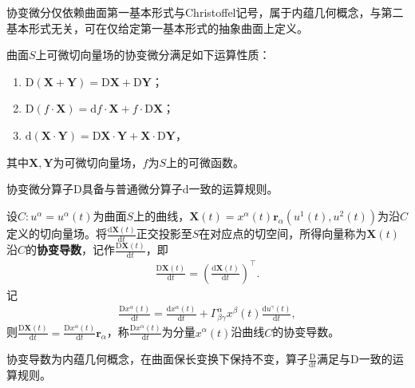 \documentclass[../../main.tex]{subfiles}%
\begin{document}
\begin{remark}
协变微分仅依赖曲面第一基本形式与Christoffel记号，属于内蕴几何概念，与第二基本形式无关，可在仅给定第一基本形式的抽象曲面上定义。
\end{remark}

\begin{theorem}
曲面$S$上可微切向量场的协变微分满足如下运算性质：
\begin{enumerate}[(1)]
\item $\mathrm{D}(\boldsymbol{X}+\boldsymbol{Y})=\mathrm{D}\boldsymbol{X}+\mathrm{D}\boldsymbol{Y}$；
\item $\mathrm{D}(f\cdot\boldsymbol{X})=\mathrm{d}f\cdot\boldsymbol{X}+f\cdot\mathrm{D}\boldsymbol{X}$；
\item $\mathrm{d}(\boldsymbol{X}\cdot\boldsymbol{Y})=\mathrm{D}\boldsymbol{X}\cdot\boldsymbol{Y}+\boldsymbol{X}\cdot\mathrm{D}\boldsymbol{Y}$，
\end{enumerate}
其中$\boldsymbol{X},\boldsymbol{Y}$为可微切向量场，$f$为$S$上的可微函数。
\end{theorem}

\begin{remark}
协变微分算子$\mathrm{D}$具备与普通微分算子$\mathrm{d}$一致的运算规则。
\end{remark}

\begin{definition}
设$C:u^\alpha=u^\alpha(t)$为曲面$S$上的曲线，$\boldsymbol{X}(t)=x^\alpha(t)\boldsymbol{r}_\alpha(u^1(t),u^2(t))$为沿$C$定义的切向量场。将$\frac{\mathrm{d}\boldsymbol{X}(t)}{\mathrm{d}t}$正交投影至$S$在对应点的切空间，所得向量称为$\boldsymbol{X}(t)$沿$C$的\textbf{协变导数}，记作$\frac{\mathrm{D}\boldsymbol{X}(t)}{\mathrm{d}t}$，即
\begin{align}
\frac{\mathrm{D}\boldsymbol{X}(t)}{\mathrm{d}t}=\left(\frac{\mathrm{d}\boldsymbol{X}(t)}{\mathrm{d}t}\right)^\top.
\label{eq:cov_der_vec}
\end{align}
记
\begin{align}
\frac{\mathrm{D}x^\alpha(t)}{\mathrm{d}t}=\frac{\mathrm{d}x^\alpha(t)}{\mathrm{d}t}+\Gamma_{\beta\gamma}^\alpha x^\beta(t)\frac{\mathrm{d}u^\gamma(t)}{\mathrm{d}t},
\label{eq:cov_der_comp}
\end{align}
则$\frac{\mathrm{D}\boldsymbol{X}(t)}{\mathrm{d}t}=\frac{\mathrm{D}x^\alpha(t)}{\mathrm{d}t}\boldsymbol{r}_\alpha$，称$\frac{\mathrm{D}x^\alpha(t)}{\mathrm{d}t}$为分量$x^\alpha(t)$沿曲线$C$的协变导数。
\end{definition}

\begin{remark}
协变导数为内蕴几何概念，在曲面保长变换下保持不变，算子$\frac{\mathrm{D}}{\mathrm{d}t}$满足与$\mathrm{D}$一致的运算规则。
\end{remark}
\end{document}
